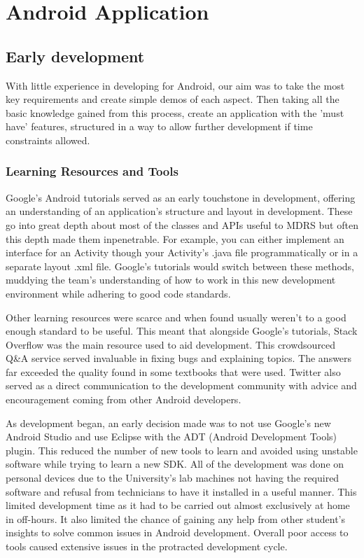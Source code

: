 \documentclass{l3proj}
\begin{document}
\section{Android Application}

\subsection{Early development} With little experience in developing for Android, our aim was to take the most key requirements and create simple demos of each aspect. Then taking all the basic knowledge gained from this process, create an application with the 'must have' features, structured in a way to allow further development if time constraints allowed.

\subsubsection{Learning Resources and Tools} Google's Android tutorials served as an early touchstone in development, offering an understanding of an application's structure and layout in development. These go into great depth about most of the classes and APIs useful to MDRS but often this depth made them inpenetrable. For example, you can either implement an interface for an Activity though your Activity's .java file programmatically or in a separate layout .xml file. Google's tutorials would switch between these methods, muddying the team's understanding of how to work in this new development environment while adhering to good code standards.

Other learning resources were scarce and when found usually weren't to a good enough standard to be useful. This meant that alongside Google's tutorials, Stack Overflow was the main resource used to aid development. This crowdsourced Q\&A service served invaluable in fixing bugs and explaining topics. The answers far exceeded the quality found in some textbooks that were used. Twitter also served as a direct communication to the development community with advice and encouragement coming from other Android developers.

As development began, an early decision made was to not use Google's new Android Studio and use Eclipse with the ADT (Android Development Tools) plugin. This reduced the number of new tools to learn and avoided using unstable software while trying to learn a new SDK. All of the development was done on personal devices due to the University's lab machines not having the required software and refusal from technicians to have it installed in a useful manner. This limited development time as it had to be carried out almost exclusively at home in off-hours. It also limited the chance of gaining any help from other student's insights to solve common issues in Android development. Overall poor access to tools caused extensive issues in the protracted  development cycle.
\end{document}
